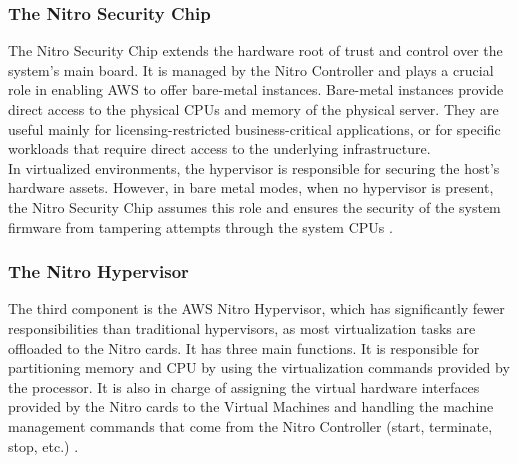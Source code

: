 \subsubsection{The Nitro Security Chip}
The Nitro Security Chip extends the hardware root of trust and control over the system's main board. It
is managed by the Nitro Controller and plays a crucial role in enabling 
AWS to offer bare-metal instances. Bare-metal instances provide direct access to the physical CPUs and memory 
of the physical server. They are useful mainly for licensing-restricted business-critical applications, or for 
specific workloads that require direct access to the underlying infrastructure. \\ 
In virtualized environments, the hypervisor is responsible for securing the host's hardware assets. 
However, in bare metal modes, when no hypervisor is present, the Nitro Security Chip 
assumes this role and ensures the security of the system firmware from tampering attempts through the system 
CPUs \cite{nitro_whitepaper}. 

\subsubsection{The Nitro Hypervisor}
The third component is the AWS Nitro Hypervisor, which has significantly fewer responsibilities than traditional
hypervisors, as most virtualization tasks are offloaded to the Nitro cards. It has three main functions.
It is responsible for partitioning memory and CPU by using the virtualization commands provided by the 
processor. It is also in charge of assigning the virtual hardware interfaces provided by 
the Nitro cards to the Virtual Machines and handling the machine management commands that come from 
the Nitro Controller (start, terminate, stop, etc.) \cite{nitro_whitepaper}. 

